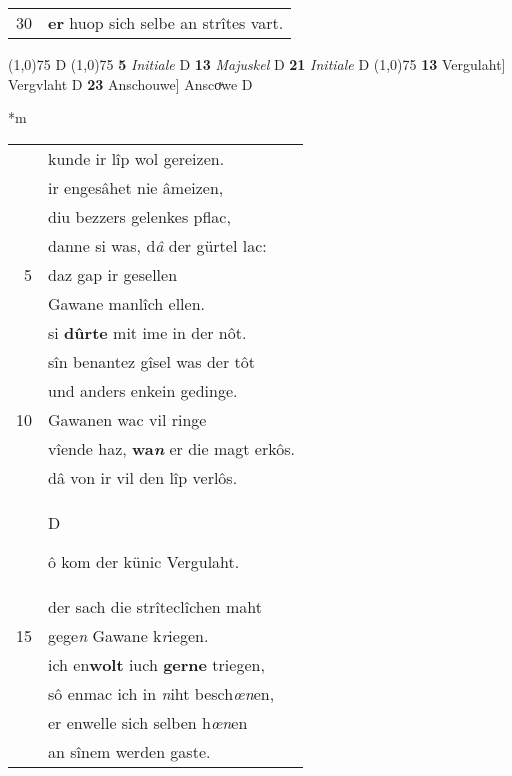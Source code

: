 \documentclass[8pt,a4paper,notitlepage]{article}
\begin{document}
\begin{table}[ht]
\begin{minipage}[t]{0.5\linewidth}
\begin{tabular}{rl}
30 & \textbf{er} huop sich selbe an strîtes vart.\\ 
\end{tabular}
\scriptsize
\line(1,0){75} \newline
D \newline
\line(1,0){75} \newline
\textbf{5} \textit{Initiale} D  \textbf{13} \textit{Majuskel} D  \textbf{21} \textit{Initiale} D  \newline
\line(1,0){75} \newline
\textbf{13} Vergulaht] Vergvlaht D \textbf{23} Anschouwe] Anscoͮwe D \newline
\end{minipage}
\hspace{0.5cm}
\begin{minipage}[t]{0.5\linewidth}
\small
\begin{center}*m
\end{center}
\begin{tabular}{rl}
 & kunde ir lîp wol gereizen.\\ 
 & ir engesâhet nie âmeizen,\\ 
 & diu bezzers gelenkes pflac,\\ 
 & danne si was, d\textit{â} der gürtel lac:\\ 
5 & daz gap ir gesellen\\ 
 & Gawane manlîch ellen.\\ 
 & si \textbf{dûrte} mit ime in der nôt.\\ 
 & sîn benantez gîsel was der tôt\\ 
 & und anders enkein gedinge.\\ 
10 & Gawanen wac vil ringe\\ 
 & vîende haz, \textbf{wa\textit{n}} er die magt erkôs.\\ 
 & dâ von ir vil den lîp verlôs.\\ 
 & \begin{large}D\end{large}ô kom der künic Vergulaht.\\ 
 & der sach die strîteclîchen maht\\ 
15 & gege\textit{n} Gawane k\textit{r}iegen.\\ 
 & ich en\textbf{wolt} iuch \textbf{gerne} triegen,\\ 
 & sô enmac ich in \textit{n}iht besch\textit{œn}en,\\ 
 & er enwelle sich selben h\textit{œn}en\\ 
 & an sînem werden gaste.\\ 

\end{tabular}
\end{minipage}
\end{table}
\end{document}
